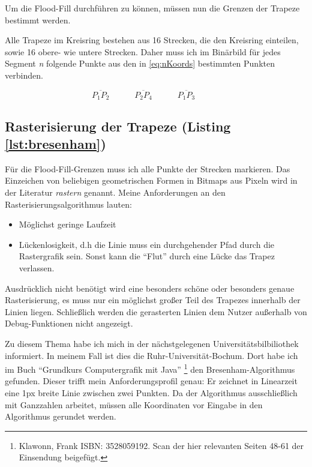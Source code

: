 Um die Flood-Fill durchführen zu können, müssen nun die Grenzen der Trapeze bestimmt werden. 

Alle Trapeze im Kreisring bestehen aus 16 Strecken, die den Kreisring einteilen, sowie 16 obere- wie untere Strecken. Daher muss ich im Binärbild für jedes Segment \textit{n} folgende Punkte aus den in \eqref{eq:nKoords} bestimmten Punkten verbinden.
	
\begin{equation}
	\overline{P_1P_2} \hspace{3em}
	\overline{P_2P_4} \hspace{3em}
	\overline{P_1P_3} \hspace{3em}
\end{equation}

\subsection{Rasterisierung der Trapeze (Listing \ref{lst:bresenham})}
Für die Flood-Fill-Grenzen muss ich alle Punkte der Strecken markieren. Das Einzeichen von beliebigen geometrischen Formen in Bitmaps aus Pixeln wird in der Literatur \textit{rastern} genannt. Meine Anforderungen an den Rasterisierungsalgorithmus lauten:
\begin{itemize}
	\item Möglichst geringe Laufzeit
	\item Lückenlosigkeit, d.h die Linie muss ein durchgehender Pfad durch die Rastergrafik sein. Sonst kann die "`Flut"' durch eine Lücke das Trapez verlassen.
\end{itemize}
Ausdrücklich nicht benötigt wird eine besonders schöne oder besonders genaue Rasterisierung, es muss nur ein möglichst großer Teil des Trapezes innerhalb der Linien liegen. Schließlich werden die gerasterten Linien dem Nutzer außerhalb von Debug-Funktionen nicht angezeigt.

Zu diesem Thema habe ich mich in der nächstgelegenen Universitätsbilbiliothek informiert. In meinem Fall ist dies die Ruhr-Universität-Bochum. Dort habe ich im Buch "`Grundkurs Computergrafik mit Java"' \footnote{Klawonn, Frank ISBN: 3528059192. Scan der hier relevanten Seiten 48-61 der Einsendung beigefügt.} den Bresenham-Algorithmus gefunden. Dieser trifft mein Anforderungsprofil genau: Er zeichnet in Linearzeit eine 1px breite Linie zwischen zwei Punkten. Da der Algorithmus ausschließlich mit Ganzzahlen arbeitet, müssen alle Koordinaten vor Eingabe in den Algorithmus gerundet werden.

